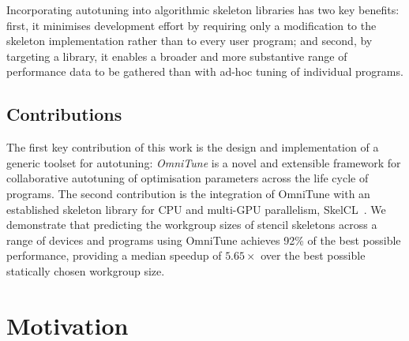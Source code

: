 \documentclass[nonatbib,preprint,9pt]{sigplanconf}
\begin{document}
Incorporating autotuning into algorithmic skeleton libraries has two
key benefits: first, it minimises development effort by requiring only
a modification to the skeleton implementation rather than to every
user program; and second, by targeting a library, it enables a broader
and more substantive range of performance data to be gathered than
with ad-hoc tuning of individual programs.


\subsection{Contributions}

The first key contribution of this work is the design and
implementation of a generic toolset for autotuning: \emph{OmniTune} is
a novel and extensible framework for collaborative autotuning of
optimisation parameters across the life cycle of programs. The second
contribution is the integration of OmniTune with an established
skeleton library for CPU and multi-GPU parallelism,
SkelCL~\cite{Steuwer2011}. We demonstrate that predicting the
workgroup sizes of stencil skeletons across a range of devices and
programs using OmniTune achieves 92\% of the best possible
performance, providing a median speedup of $5.65\times$ over the best
possible statically chosen workgroup size.


\section{Motivation}
\end{document}
